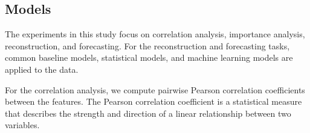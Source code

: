\subsection{Models}

The experiments in this study focus on correlation analysis, importance analysis, reconstruction, and forecasting. For the reconstruction and forecasting tasks, common baseline models, statistical models, and machine learning models are applied to the data.

For the correlation analysis, we compute pairwise Pearson correlation coefficients between the features. The Pearson correlation coefficient is a statistical measure that describes the strength and direction of a linear relationship between two variables.

